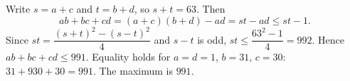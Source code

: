 Write $s=a+c$ and $t=b+d$, so $s+t=63$. Then
\[ab+bc+cd=(a+c)(b+d)-ad=st-ad\le st-1.\]
Since $st=\dfrac{(s+t)^2-(s-t)^2}{4}$ and $s-t$ is odd, $st\le\dfrac{63^2-1}{4}=992$. Hence $ab+bc+cd\le991$. Equality holds for $a=d=1$, $b=31$, $c=30$: $31+930+30=991$. The maximum is $\boxed{991}$.
